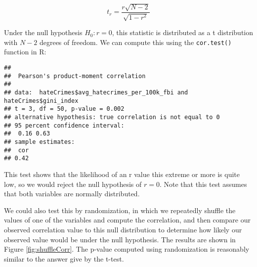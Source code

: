 \documentclass[]{book}
\newenvironment{Shaded}{\begin{snugshade}}{\end{snugshade}}
\newcommand{\KeywordTok}[1]{\textcolor[rgb]{0.13,0.29,0.53}{\textbf{#1}}}
\newcommand{\DecValTok}[1]{\textcolor[rgb]{0.00,0.00,0.81}{#1}}
\newcommand{\StringTok}[1]{\textcolor[rgb]{0.31,0.60,0.02}{#1}}
\newcommand{\CommentTok}[1]{\textcolor[rgb]{0.56,0.35,0.01}{\textit{#1}}}
\newcommand{\ControlFlowTok}[1]{\textcolor[rgb]{0.13,0.29,0.53}{\textbf{#1}}}
\newcommand{\OperatorTok}[1]{\textcolor[rgb]{0.81,0.36,0.00}{\textbf{#1}}}
\newcommand{\NormalTok}[1]{#1}
\theoremstyle{definition}
\theoremstyle{definition}
\theoremstyle{definition}
\theoremstyle{remark}
\begin{document}
\[
\textit{t}_r =  \frac{r\sqrt{N-2}}{\sqrt{1-r^2}}
\]

Under the null hypothesis \(H_0:r=0\), this statistic is distributed as
a t distribution with \(N - 2\) degrees of freedom. We can compute this
using the \texttt{cor.test()} function in R:

\begin{Shaded}
\end{Shaded}

\begin{verbatim}
## 
##  Pearson's product-moment correlation
## 
## data:  hateCrimes$avg_hatecrimes_per_100k_fbi and hateCrimes$gini_index
## t = 3, df = 50, p-value = 0.002
## alternative hypothesis: true correlation is not equal to 0
## 95 percent confidence interval:
##  0.16 0.63
## sample estimates:
##  cor 
## 0.42
\end{verbatim}

This test shows that the likelihood of an r value this extreme or more
is quite low, so we would reject the null hypothesis of \(r=0\). Note
that this test assumes that both variables are normally distributed.

We could also test this by randomization, in which we repeatedly shuffle
the values of one of the variables and compute the correlation, and then
compare our observed correlation value to this null distribution to
determine how likely our observed value would be under the null
hypothesis. The results are shown in Figure \ref{fig:shuffleCorr}. The
p-value computed using randomization is reasonably similar to the answer
give by the t-test.

\begin{Shaded}
\end{Shaded}
\end{document}
